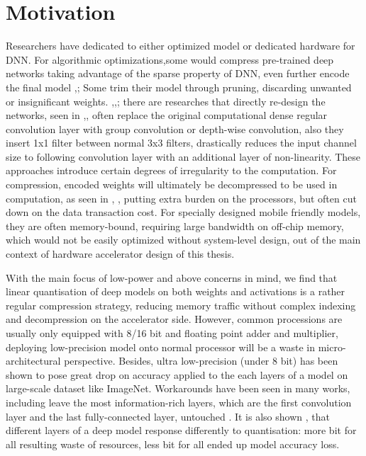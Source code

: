 \section{Motivation}
Researchers have dedicated to either optimized model or dedicated hardware for DNN. For algorithmic optimizations,some would compress pre-trained deep networks taking advantage of the sparse property of DNN, even further encode the final model \cite{DeepCompression},\cite{Eyeriss}; Some trim their model through pruning, discarding unwanted or insignificant weights. \cite{DeepCompression},\cite{ThiNet},; there are researches that directly re-design the networks, seen in \cite{MobileNet},\cite{ShuffleNet}, often replace the original computational dense regular convolution layer with group convolution or depth-wise convolution, also they insert 1x1 filter between normal 3x3 filters, drastically reduces the input channel size to following convolution layer with an additional layer of non-linearity. These approaches introduce certain degrees of irregularity to the computation. For compression, encoded weights will ultimately be decompressed to be used in computation, as seen in \cite{EIE}, \cite{Eyeriss}, putting extra burden on the processors, but often cut down on the data transaction cost. For specially designed mobile friendly models, they are often memory-bound, requiring large bandwidth on off-chip memory, which would not be easily optimized without system-level design, out of the main context of hardware accelerator design of this thesis.

With the main focus of low-power and above concerns in mind, we find that linear quantisation of deep models on both weights and activations is a rather regular compression strategy, reducing memory traffic without complex indexing and decompression on the accelerator side. However, common processions are usually only equipped with 8/16 bit and floating point adder and multiplier, deploying low-precision model onto normal processor will be a waste in micro-architectural perspective.
Besides, ultra low-precision (under 8 bit) has been shown to pose great drop on accuracy applied to the each layers of a model on large-scale dataset like ImageNet. Workarounds have been seen in many works, including leave the most information-rich layers, which are the first convolution layer and the last fully-connected layer, untouched \cite{XnorNet}. It is also shown \cite{XnorNet},\cite{FixedPoint} that different layers of a deep model response differently to quantisation: more bit for all resulting waste of resources, less bit for all ended up model accuracy loss.

